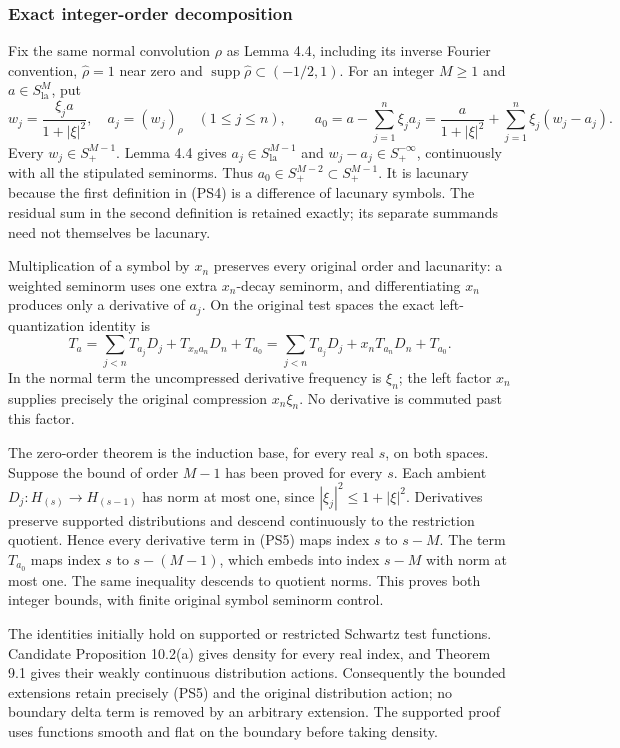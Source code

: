 \documentclass[
  11pt,
]{article}
\begin{document}
\subsubsection{Exact integer-order
decomposition}\label{exact-integer-order-decomposition}

Fix the same normal convolution \(\rho\) as Lemma 4.4, including its
inverse Fourier convention, \(\widehat\rho=1\) near zero and
\(\operatorname{supp}\widehat\rho\subset(-1/2,1)\). For an integer
\(M\ge1\) and \(a\in S^M_{\mathrm{la}}\), put \[
 w_j=\frac{\xi_j a}{1+|\xi|^2},\quad
 a_j=(w_j)_\rho\quad(1\le j\le n),\qquad
 a_0=a-\sum_{j=1}^n\xi_j a_j
     =\frac{a}{1+|\xi|^2}
       +\sum_{j=1}^n\xi_j(w_j-a_j).
 \tag{PS4}
\] Every \(w_j\in S^{M-1}_+\). Lemma 4.4 gives
\(a_j\in S^{M-1}_{\mathrm{la}}\) and \(w_j-a_j\in S^{-\infty}_+\),
continuously with all the stipulated seminorms. Thus
\(a_0\in S^{M-2}_+\subset S^{M-1}_+\). It is lacunary because the first
definition in (PS4) is a difference of lacunary symbols. The residual
sum in the second definition is retained exactly; its separate summands
need not themselves be lacunary.

Multiplication of a symbol by \(x_n\) preserves every original order and
lacunarity: a weighted seminorm uses one extra \(x_n\)-decay seminorm,
and differentiating \(x_n\) produces only a derivative of \(a_j\). On
the original test spaces the exact left-quantization identity is \[
 T_a=\sum_{j<n}T_{a_j}D_j+
       T_{x_n a_n}D_n+T_{a_0}
     =\sum_{j<n}T_{a_j}D_j+
       x_n T_{a_n}D_n+T_{a_0}.
 \tag{PS5}
\] In the normal term the uncompressed derivative frequency is
\(\xi_n\); the left factor \(x_n\) supplies precisely the original
compression \(x_n\xi_n\). No derivative is commuted past this factor.

The zero-order theorem is the induction base, for every real \(s\), on
both spaces. Suppose the bound of order \(M-1\) has been proved for
every \(s\). Each ambient \(D_j:H_{(s)}\to H_{(s-1)}\) has norm at most
one, since \(|\xi_j|^2\le1+|\xi|^2\). Derivatives preserve supported
distributions and descend continuously to the restriction quotient.
Hence every derivative term in (PS5) maps index \(s\) to \(s-M\). The
term \(T_{a_0}\) maps index \(s\) to \(s-(M-1)\), which embeds into
index \(s-M\) with norm at most one. The same inequality descends to
quotient norms. This proves both integer bounds, with finite original
symbol seminorm control.

The identities initially hold on supported or restricted Schwartz test
functions. Candidate Proposition 10.2(a) gives density for every real
index, and Theorem 9.1 gives their weakly continuous distribution
actions. Consequently the bounded extensions retain precisely (PS5) and
the original distribution action; no boundary delta term is removed by
an arbitrary extension. The supported proof uses functions smooth and
flat on the boundary before taking density.
\end{document}
